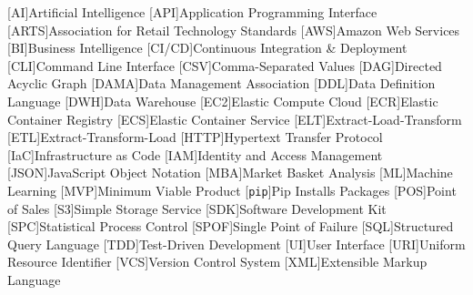 
\singlespacing
\begin{acronym}[MMMMMM]
	[AI]{Artificial Intelligence}
	[API]{Application Programming Interface}
	[ARTS]{Association for Retail Technology Standards}
	[AWS]{Amazon Web Services}
	[BI]{Business Intelligence}
	[CI/CD]{Continuous Integration \& Deployment}
	[CLI]{Command Line Interface}
	[CSV]{Comma-Separated Values}
	[DAG]{Directed Acyclic Graph}
	[DAMA]{Data Management Association}
	[DDL]{Data Definition Language}
	[DWH]{Data Warehouse}
	[EC2]{Elastic Compute Cloud}
	[ECR]{Elastic Container Registry}
	[ECS]{Elastic Container Service}
	[ELT]{Extract-Load-Transform}
	[ETL]{Extract-Transform-Load}
	[HTTP]{Hypertext Transfer Protocol}
	[IaC]{Infrastructure as Code}
	[IAM]{Identity and Access Management}
	[JSON]{JavaScript Object Notation}
	[MBA]{Market Basket Analysis}
	[ML]{Machine Learning}
	[MVP]{Minimum Viable Product}
	[\texttt{pip}]{Pip Installs Packages}
	[POS]{Point of Sales}
	[S3]{Simple Storage Service}
	[SDK]{Software Development Kit}
	[SPC]{Statistical Process Control}
	[SPOF]{Single Point of Failure}
	[SQL]{Structured Query Language}
	[TDD]{Test-Driven Development}
	[UI]{User Interface}
	[URI]{Uniform Resource Identifier}
	[VCS]{Version Control System}
	[XML]{Extensible Markup Language}
\end{acronym}
\onehalfspacing